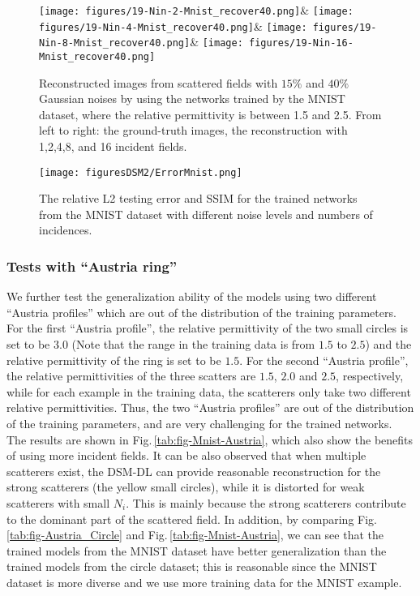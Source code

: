 \documentclass{article}
\begin{document}
\begin{figure}[htp]
\begin{center}
\begin{tblr}
				\texttt{[image: figures/19-Nin-2-Mnist\_recover40.png]}&
				\texttt{[image: figures/19-Nin-4-Mnist\_recover40.png]}&
				\texttt{[image: figures/19-Nin-8-Mnist\_recover40.png]}&
				\texttt{[image: figures/19-Nin-16-Mnist\_recover40.png]}
			\end{tblr}
			\caption{Reconstructed images from scattered fields with $15\%$ and $40\%$  Gaussian noises by using the networks trained by the MNIST dataset, where the relative permittivity is between 1.5 and 2.5. From left to right: the ground-truth images, the reconstruction with 1,2,4,8, and 16 incident fields.}
			\label{tab:fig-Mnist}
		\end{center}
	\end{figure}
    
\begin{figure}[htp]
	\centering
	\texttt{[image: figuresDSM2/ErrorMnist.png]}
	\caption{The relative L2 testing error and SSIM for the trained networks from the MNIST dataset with different noise levels and numbers of incidences.}
	\label{fig:Error_Mnist}
\end{figure}
	
	\subsubsection{Tests with “Austria ring”}
	
	We further test the generalization ability of the models using two different “Austria profiles” which are out of the distribution of the training parameters. For the first  “Austria profile”, the relative permittivity of the two small circles is set to be $3.0$ (Note that the range in the training data is from $1.5$ to $2.5$) and the relative permittivity of the ring is set to be $1.5$. For the second “Austria profile”, the relative permittivities of the three scatters are $1.5$, $2.0$ and $2.5$, respectively, while for each example in the training data, the scatterers only take two different relative permittivities. Thus, the two “Austria profiles” are out of the distribution of the training parameters, and are very challenging for the trained networks. The results are shown in Fig.\,\ref{tab:fig-Mnist-Austria}, which also show the benefits of using more incident fields. It can be also observed that when multiple scatterers exist, the DSM-DL can provide reasonable reconstruction for the strong scatterers (the yellow small circles), while it is distorted for weak scatterers with small $N_i$. This is mainly because the strong scatterers contribute to the dominant part of the scattered field. In addition, by comparing Fig.\,\ref{tab:fig-Austria_Circle} and Fig.\,\ref{tab:fig-Mnist-Austria}, we can see that the trained models from the MNIST dataset have better generalization than the trained models from the circle dataset; this is reasonable since the MNIST dataset is more diverse and we use more training data for the MNIST example.  
	
\end{document}
